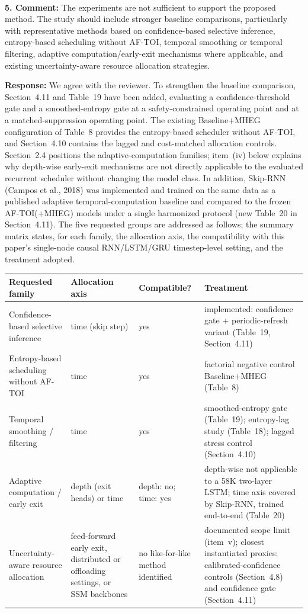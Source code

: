 \documentclass[1p,12pt,authoryear]{elsarticle}
\begin{document}
~

\noindent \textbf{5. Comment:} The experiments are not sufficient to support the proposed method. The study should include stronger baseline comparisons, particularly with representative methods based on confidence-based selective inference, entropy-based scheduling without AF-TOI, temporal smoothing or temporal filtering, adaptive computation/early-exit mechanisms where applicable, and existing uncertainty-aware resource allocation strategies.

\vspace{2mm}
\noindent \textbf{Response:} We agree with the reviewer. To strengthen the baseline comparison, Section~4.11 and Table~19 have been added, evaluating a confidence-threshold gate and a smoothed-entropy gate at a safety-constrained operating point and at a matched-suppression operating point. The existing Baseline+MHEG configuration of Table~8 provides the entropy-based scheduler without AF-TOI, and Section~4.10 contains the lagged and cost-matched allocation controls. Section~2.4 positions the adaptive-computation families; item~(iv) below explains why depth-wise early-exit mechanisms are not directly applicable to the evaluated recurrent scheduler without changing the model class. In addition, Skip-RNN (Campos et al., 2018) was implemented and trained on the same data as a published adaptive temporal-computation baseline and compared to the frozen AF-TOI(+MHEG) models under a single harmonized protocol (new Table~20 in Section~4.11). The five requested groups are addressed as follows; the summary matrix
states, for each family, the allocation axis, the compatibility with this
paper's single-node causal RNN/LSTM/GRU timestep-level setting, and the
treatment adopted.

\begin{center}\footnotesize
\begin{tabular}{p{3.3cm} p{2.5cm} p{2.3cm} p{4.8cm}}
\hline
\textbf{Requested family} & \textbf{Allocation axis} & \textbf{Compatible?} & \textbf{Treatment} \\
\hline
Confidence-based selective inference & time (skip step) & yes & implemented: confidence gate + periodic-refresh variant (Table~19, Section~4.11) \\
Entropy-based scheduling without AF-TOI & time & yes & factorial negative control Baseline+MHEG (Table~8) \\
Temporal smoothing / filtering & time & yes & smoothed-entropy gate (Table~19); entropy-lag study (Table~18); lagged stress control (Section~4.10) \\
Adaptive computation / early exit & depth (exit heads) or time & depth: no; time: yes & depth-wise not applicable to a 58K two-layer LSTM; time axis covered by Skip-RNN, trained end-to-end (Table~20) \\
Uncertainty-aware resource allocation & feed-forward early exit, distributed or offloading settings, or SSM backbones & no like-for-like method identified & documented scope limit (item~v); closest instantiated proxies: calibrated-confidence controls (Section~4.8) and confidence gate (Section~4.11) \\
\hline
\end{tabular}
\end{center}
\end{document}
